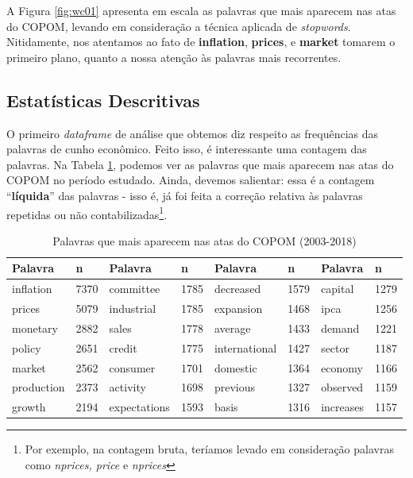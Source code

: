 A Figura \ref{fig:wc01} apresenta em escala as palavras que mais aparecem nas atas do COPOM, levando em consideração a técnica aplicada de \textit{stopwords}. Nitidamente, nos atentamos ao fato de \textbf{inflation}, \textbf{prices}, e \textbf{market} tomarem o primeiro plano, quanto a nossa atenção às palavras mais recorrentes.

\subsection{Estatísticas Descritivas}

O primeiro \textit{dataframe} de análise que obtemos diz respeito as frequências das palavras de cunho econômico. Feito isso, é interessante uma contagem das palavras. Na Tabela \ref{tab:contgeral}, podemos ver as palavras que mais aparecem nas atas do COPOM no período estudado. Ainda, devemos salientar:  essa é a contagem ``\textbf{líquida}'' das palavras - isso é, já foi feita a correção relativa às palavras repetidas ou não contabilizadas\footnote{Por exemplo, na contagem bruta, teríamos levado em consideração palavras como \textit{nprices, price} e \textit{nprices}}. 

\begin{table}[!h]
\centering
\caption{Palavras que mais aparecem nas atas do COPOM (2003-2018)}
\begin{tabular}{ll|ll|ll|ll}
\hline
Palavra    & n    & Palavra      & n    & Palavra       & n    & Palavra   & n    \\ \hline
inflation  & 7370 & committee    & 1785 & decreased     & 1579 & capital   & 1279 \\
prices     & 5079 & industrial   & 1785 & expansion     & 1468 & ipca      & 1256 \\
monetary   & 2882 & sales        & 1778 & average       & 1433 & demand    & 1221 \\
policy     & 2651 & credit       & 1775 & international & 1427 & sector    & 1187 \\
market     & 2562 & consumer     & 1701 & domestic      & 1364 & economy   & 1166 \\
production & 2373 & activity     & 1698 & previous      & 1327 & observed  & 1159 \\
growth     & 2194 & expectations & 1593 & basis         & 1316 & increases & 1157 \\ \hline
\end{tabular}
\label{tab:contgeral}
\end{table}

